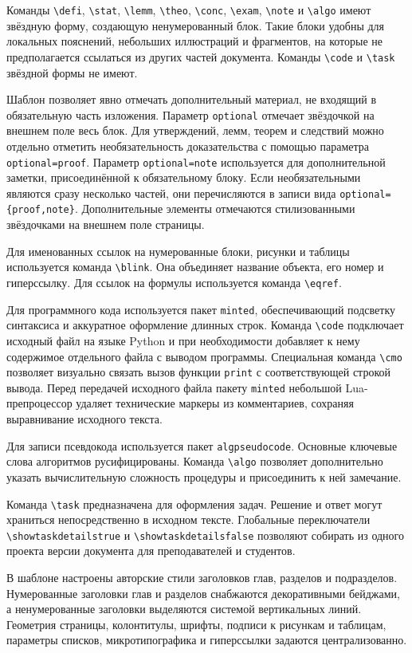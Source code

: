 Команды \verb|\defi|, \verb|\stat|, \verb|\lemm|, \verb|\theo|, \verb|\conc|, \verb|\exam|, \verb|\note| и \verb|\algo| имеют звёздную форму, создающую ненумерованный блок.
Такие блоки удобны для локальных пояснений, небольших иллюстраций и фрагментов, на которые не предполагается ссылаться из других частей документа.
Команды \verb|\code| и \verb|\task| звёздной формы не имеют.

Шаблон позволяет явно отмечать дополнительный материал, не входящий в обязательную часть изложения.
Параметр \verb|optional| отмечает звёздочкой на внешнем поле весь блок.
Для утверждений, лемм, теорем и следствий можно отдельно отметить необязательность доказательства с помощью параметра \verb|optional=proof|.
Параметр \verb|optional=note| используется для дополнительной заметки, присоединённой к обязательному блоку.
Если необязательными являются сразу несколько частей, они перечисляются в записи вида \verb|optional={proof,note}|.
Дополнительные элементы отмечаются стилизованными звёздочками на внешнем поле страницы.

Для именованных ссылок на нумерованные блоки, рисунки и таблицы используется команда \verb|\blink|.
Она объединяет название объекта, его номер и гиперссылку.
Для ссылок на формулы используется команда \verb|\eqref|.

Для программного кода используется пакет \texttt{minted}, обеспечивающий подсветку синтаксиса и аккуратное оформление длинных строк.
Команда \verb|\code| подключает исходный файл на языке Python и при необходимости добавляет к нему содержимое отдельного файла с выводом программы.
Специальная команда \verb|\cmo| позволяет визуально связать вызов функции \texttt{print} с соответствующей строкой вывода.
Перед передачей исходного файла пакету \texttt{minted} небольшой Lua-препроцессор удаляет технические маркеры из комментариев, сохраняя выравнивание исходного текста.

Для записи псевдокода используется пакет \texttt{algpseudocode}.
Основные ключевые слова алгоритмов русифицированы.
Команда \verb|\algo| позволяет дополнительно указать вычислительную сложность процедуры и присоединить к ней замечание.

Команда \verb|\task| предназначена для оформления задач.
Решение и ответ могут храниться непосредственно в исходном тексте.
Глобальные переключатели \verb|\showtaskdetailstrue| и \verb|\showtaskdetailsfalse| позволяют собирать из одного проекта версии документа для преподавателей и студентов.

В шаблоне настроены авторские стили заголовков глав, разделов и подразделов.
Нумерованные заголовки глав и разделов снабжаются декоративными бейджами, а ненумерованные заголовки выделяются системой вертикальных линий.
Геометрия страницы, колонтитулы, шрифты, подписи к рисункам и таблицам, параметры списков, микротипографика и гиперссылки задаются централизованно.


